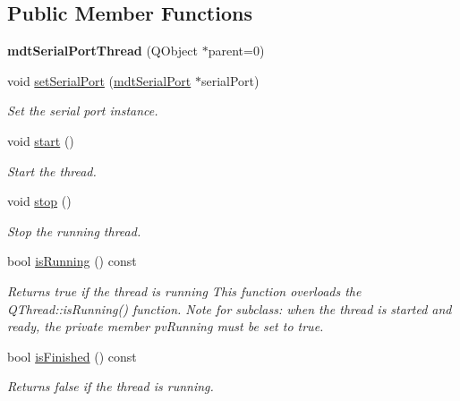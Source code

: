 \subsection*{Public Member Functions}
\begin{DoxyCompactItemize}
\item 
\hypertarget{classmdt_serial_port_thread_a084bb7b4e7469c22486a7893dc546054}{
{\bfseries mdtSerialPortThread} (QObject $\ast$parent=0)}
\label{classmdt_serial_port_thread_a084bb7b4e7469c22486a7893dc546054}

\item 
void \hyperlink{classmdt_serial_port_thread_ab231b499e113cbd1792573ab36bdf0d3}{setSerialPort} (\hyperlink{classmdt_serial_port}{mdtSerialPort} $\ast$serialPort)
\begin{DoxyCompactList}\small\item\em Set the serial port instance. \end{DoxyCompactList}\item 
void \hyperlink{classmdt_serial_port_thread_ac0f04d7052b214065e09752760510fa7}{start} ()
\begin{DoxyCompactList}\small\item\em Start the thread. \end{DoxyCompactList}\item 
void \hyperlink{classmdt_serial_port_thread_a06e414de27a01560837f388203e2965a}{stop} ()
\begin{DoxyCompactList}\small\item\em Stop the running thread. \end{DoxyCompactList}\item 
\hypertarget{classmdt_serial_port_thread_a8d5764b30af84f24dc4712f28477050b}{
bool \hyperlink{classmdt_serial_port_thread_a8d5764b30af84f24dc4712f28477050b}{isRunning} () const }
\label{classmdt_serial_port_thread_a8d5764b30af84f24dc4712f28477050b}

\begin{DoxyCompactList}\small\item\em Returns true if the thread is running This function overloads the QThread::isRunning() function. Note for subclass: when the thread is started and ready, the private member pvRunning must be set to true. \end{DoxyCompactList}\item 
bool \hyperlink{classmdt_serial_port_thread_a178a2a5fe4922d74be33c81a677ca19e}{isFinished} () const 
\begin{DoxyCompactList}\small\item\em Returns false if the thread is running. \end{DoxyCompactList}\end{DoxyCompactItemize}
